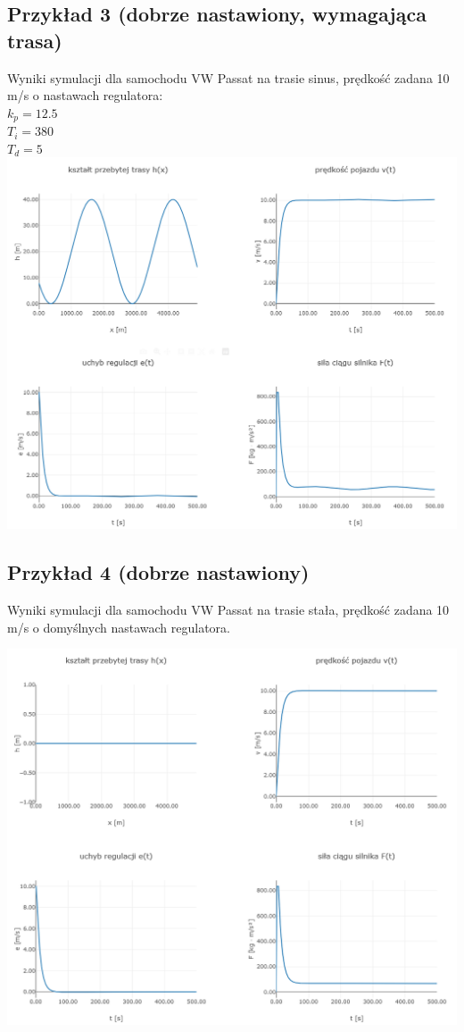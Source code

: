\documentclass[12pt,a4paper]{article}
\begin{document}
	\subsection{Przykład 3 (dobrze nastawiony, wymagająca trasa)}
	Wyniki symulacji dla samochodu VW Passat na trasie sinus, prędkość zadana 10 m/s o nastawach regulatora: \\
	$k_p = 12.5$ \\
	$T_i = 380$ \\ 
	$T_d = 5$ \\
	
	\includegraphics[width=0.9\linewidth]{"zrzut 3.png"}
	\newpage
	\subsection{Przykład 4 (dobrze nastawiony)}
	Wyniki symulacji dla samochodu VW Passat na trasie stała, prędkość zadana 10 m/s o domyślnych nastawach regulatora.
	
	\includegraphics[width=0.9\linewidth]{"zrzut 4.png"}
	\newpage
\end{document}
